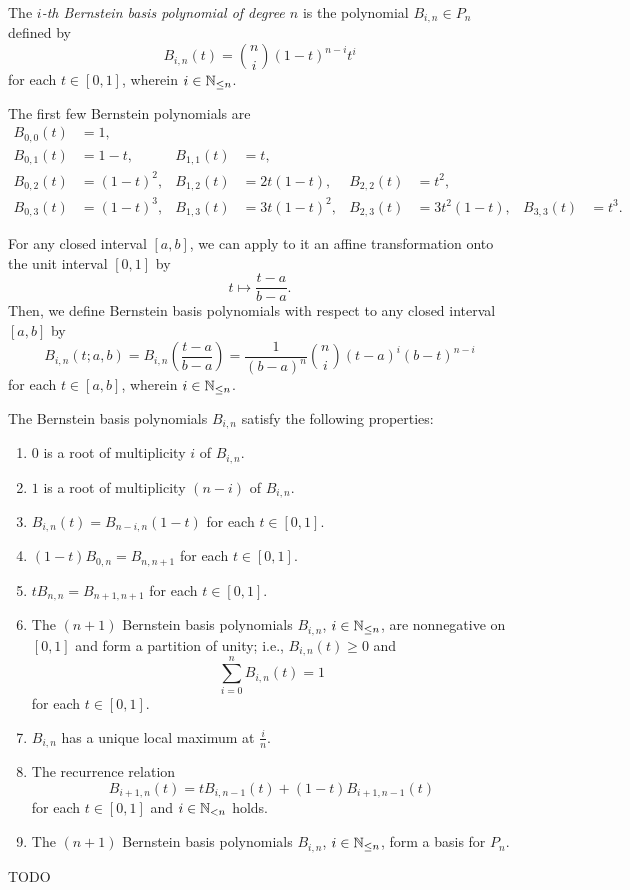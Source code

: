 \Bdf
  The \emph{\(i\)-th Bernstein basis polynomial of degree \(n\)} is the polynomial \(B_{i, n} \in P_n\) defined by
  \[
    B_{i, n}(t) = \binom{n}{i} (1 - t)^{n - i} t^i
  \]
  for each \(t \in [0, 1]\), wherein \(i \in \mathbb{N}_{\leq n}\).
\Edf

\Bxm
  The first few Bernstein polynomials are
  \begin{align*}
    B_{0, 0}(t) & = 1,\\
    B_{0, 1}(t) & = 1 - t, & B_{1, 1}(t) & = t,\\
    B_{0, 2}(t) & = (1 - t)^2, & B_{1, 2}(t) & = 2 t (1 - t), & B_{2, 2}(t) & = t^2,\\
    B_{0, 3}(t) & = (1 - t)^3, & B_{1, 3}(t) & = 3 t (1 - t)^2, & B_{2, 3}(t) & = 3 t^2 (1 - t), & B_{3, 3}(t) & = t^3.
  \end{align*}
\Exm

For any closed interval \([a, b]\), we can apply to it an affine transformation onto the unit interval \([0, 1]\) by
\[
  t \mapsto \frac{t - a}{b - a}.
\]
Then, we define Bernstein basis polynomials with respect to any closed interval \([a, b]\) by
\[
  B_{i, n}(t; a, b) = B_{i, n}\left(\frac{t - a}{b - a}\right) = \frac{1}{(b - a)^n} \binom{n}{i} (t - a)^i (b - t)^{n
  - i}
\]
for each \(t \in [a, b]\), wherein \(i \in \mathbb{N}_{\leq n}\).

\Bth
  The Bernstein basis polynomials \(B_{i, n}\) satisfy the following properties:
  \begin{enumerate}
    \item \(0\) is a root of multiplicity \(i\) of \(B_{i, n}\).
    \item \(1\) is a root of multiplicity \((n - i)\) of \(B_{i, n}\).
    \item \(B_{i, n}(t) = B_{n - i, n}(1 - t)\) for each \(t \in [0, 1]\).
    \item \((1 - t) B_{0, n} = B_{n, n + 1}\) for each \(t \in [0, 1]\).
    \item \(t B_{n, n} = B_{n + 1, n + 1}\) for each \(t \in [0, 1]\).
    \item The \((n + 1)\) Bernstein basis polynomials \(B_{i, n}\), \(i \in \mathbb{N}_{\leq n}\), are nonnegative on
    \([0, 1]\) and form a partition of unity; i.e., \(B_{i, n}(t) \geq 0\) and
    \[
      \sum_{i = 0}^n B_{i, n}(t) = 1
    \]
    for each \(t \in [0, 1]\).
    \item \(B_{i, n}\) has a unique local maximum at \(\frac {i}{n}\).
    \item The recurrence relation
    \[
      B_{i + 1, n}(t) = t B_{i, n - 1}(t) + (1 - t) B_{i + 1, n - 1}(t)
    \]
    for each \(t \in [0, 1]\) and \(i \in \mathbb{N}_{<n}\) holds.
    \item The \((n + 1)\) Bernstein basis polynomials \(B_{i, n}\), \(i \in \mathbb{N}_{\leq n}\), form a basis for
    \(P_n\).
  \end{enumerate}
\Eth
\Bpr
  TODO %
\Epr

